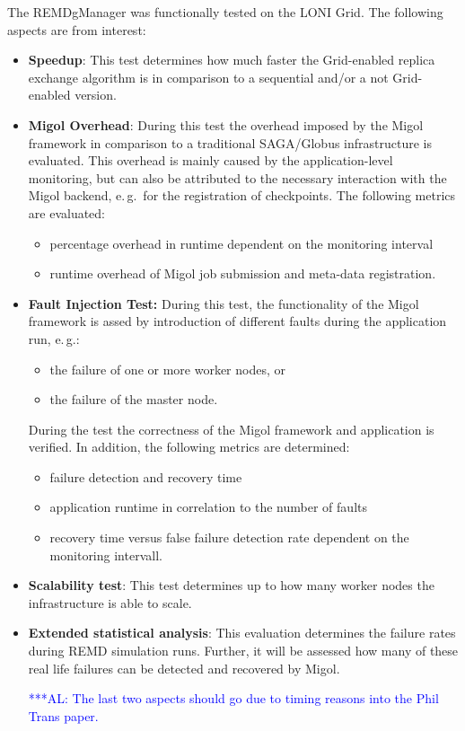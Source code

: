 \documentclass[times, 10pt,twocolumn]{article}
\newcommand{\alnote}[1]{ {\textcolor{blue} { ***AL: #1 }}}
\begin{document}
The REMDgManager was functionally tested on the LONI Grid. The following aspects are from interest:
\begin{itemize}
    \item \textbf{Speedup}: This test determines how much faster the Grid-enabled replica exchange algorithm is in comparison  to a sequential and/or a not Grid-enabled version.
    
    \item \textbf{Migol Overhead}:  During this test the overhead imposed by the Migol framework in comparison to a traditional SAGA/Globus infrastructure is evaluated. This overhead is mainly caused by the application-level monitoring, but can also be attributed to the necessary interaction with the Migol backend, e.\,g.\ for the registration of checkpoints. The following  metrics are evaluated:
    \begin{itemize}
        \item percentage overhead in runtime dependent on the monitoring interval
        \item runtime overhead of Migol job submission and meta-data registration. 
    \end{itemize}                                                           
    
    \item \textbf{Fault Injection Test:}  During this test, the functionality of the Migol framework is assed by introduction of different faults during the application run, e.\,g.:
    \begin{itemize}
        \item the failure of one or more worker nodes, or
        \item the failure of the master node.        
    \end{itemize}                       
    During the test the correctness of the Migol framework and application is verified. In addition, the following metrics are determined:
    \begin{itemize}
        \item failure detection and recovery time
        \item application runtime in correlation to the number of faults
        \item recovery time versus false failure detection rate dependent on the monitoring intervall.
    \end{itemize}
                                                                                 
    \item \textbf{Scalability test}: This test determines up to how many worker nodes the infrastructure is able to scale.
    \item \textbf{Extended statistical analysis}: This evaluation determines the failure rates during REMD simulation runs. Further, it will be assessed how many of these real life failures can be detected and recovered by Migol. 
                                                
    \alnote{The last two aspects should go due to timing reasons into the Phil Trans paper.}
\end{itemize}
                                             
\end{document}
